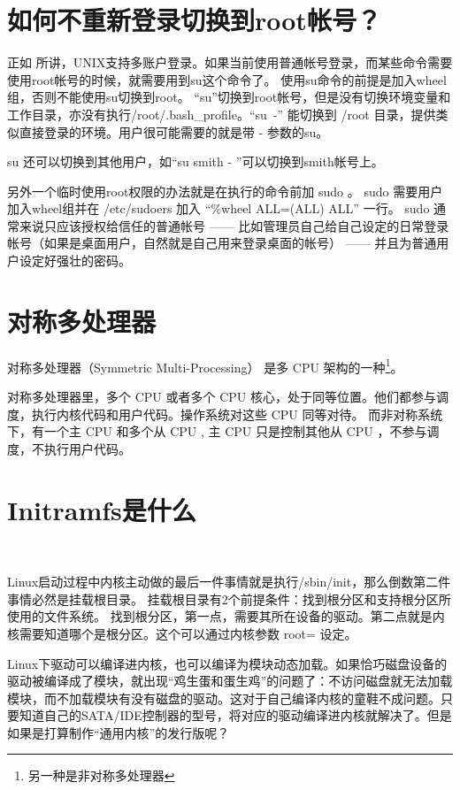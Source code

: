 \section{如何不重新登录切换到root帐号？}\label{FAQ:su}

正如  所讲，UNIX支持多账户登录。如果当前使用普通帐号登录，而某些命令需要使用root帐号的时候，就需要用到su这个命令了。
使用su命令的前提是加入wheel组，否则不能使用su切换到root。 “su”切换到root帐号，但是没有切换环境变量和工作目录，亦没有执行/root/.bash\_profile。{}“\hbox{su -}” 能切换到 /root 目录，提供类似直接登录的环境。用户很可能需要的就是带 - 参数的su。

su 还可以切换到其他用户，如“su smith - ”可以切换到smith帐号上。

另外一个临时使用root权限的办法就是在执行的命令前加 sudo 。 sudo 需要用户加入wheel组并在 /etc/sudoers 加入 “\%wheel ALL=(ALL) ALL” 一行。
sudo 通常来说只应该授权给信任的普通帐号 —— 比如管理员自己给自己设定的日常登录帐号（如果是桌面用户，自然就是自己用来登录桌面的帐号） —— 并且为普通用户设定好强壮的密码。



\section{对称多处理器}\label{FAQ:SMP}

对称多处理器（Symmetric Multi-Processing） 是多 CPU 架构的一种\footnote{另一种是非对称多处理器}。 %

对称多处理器里，多个 CPU 或者多个 CPU 核心，处于同等位置。他们都参与调度，执行内核代码和用户代码。操作系统对这些 CPU 同等对待。 而非对称系统下，有一个主 CPU 和多个从 CPU , 主 CPU 只是控制其他从 CPU ，不参与调度，不执行用户代码。

\section{Initramfs是什么}　\label{FAQ:initramfs}

Linux启动过程中内核主动做的最后一件事情就是执行/sbin/init，那么倒数第二件事情必然是挂载根目录。
挂载根目录有2个前提条件：找到根分区和支持根分区所使用的文件系统。
找到根分区，第一点，需要其所在设备的驱动。第二点就是内核需要知道哪个是根分区。这个可以通过内核参数 root= 设定。

Linux下驱动可以编译进内核，也可以编译为模块动态加载。如果恰巧磁盘设备的驱动被编译成了模块，就出现“鸡生蛋和蛋生鸡”的问题了：不访问磁盘就无法加载模块，而不加载模块有没有磁盘的驱动。这对于自己编译内核的童鞋不成问题。只要知道自己的SATA/IDE控制器的型号，将对应的驱动编译进内核就解决了。但是如果是打算制作“通用内核”的发行版呢？

